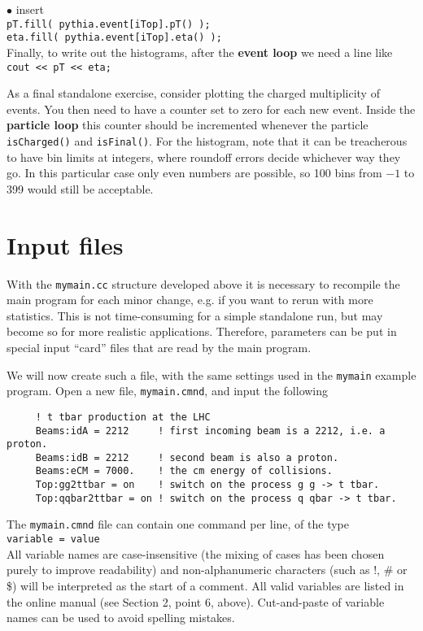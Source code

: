 \documentclass[12pt,a4paper]{article}
\newenvironment{Itemize}{\begin{list}{$\bullet$}%
{\setlength{\topsep}{0.4mm}\setlength{\partopsep}{0.4mm}%
\setlength{\itemsep}{0.4mm}\setlength{\parsep}{0.4mm}}}%
{\end{list}}
\begin{document}
\begin{Itemize}
insert \\
\hspace*{10mm}\texttt{pT.fill( pythia.event[iTop].pT() );}\\
\hspace*{10mm}\texttt{eta.fill( pythia.event[iTop].eta() );}\\
Finally, to write out the histograms, after the \textbf{event loop} we need
a line like
\hspace*{10mm}\texttt{cout << pT << eta;}
\item As a final standalone exercise, consider plotting the charged 
multiplicity of events. You then need to have a counter set to zero
for each new event. Inside the \textbf{particle loop} this counter should
be incremented whenever the particle \texttt{isCharged()} and
\texttt{isFinal()}. For the histogram, note that it can be treacherous to
have bin limits at integers, where roundoff errors decide whichever way
they go. In this particular case only even numbers are possible, so 100
bins from $-1$ to 399 would still be acceptable.
\end{Itemize}

\section{Input files}

With the \texttt{mymain.cc} structure developed above it is necessary to
recompile the main program for each minor change, e.g. if you want to
rerun with more statistics. This is not time-consuming for a simple 
standalone run, but may become so for more realistic applications.
Therefore, parameters can be put in special input ``card'' files
that are read by the main program. 

We will now create such a file, with the same settings used in the
\texttt{mymain} example program. Open a new file, \texttt{mymain.cmnd}, and
input the following
\begin{verbatim}
     ! t tbar production at the LHC
     Beams:idA = 2212     ! first incoming beam is a 2212, i.e. a proton.  
     Beams:idB = 2212     ! second beam is also a proton. 
     Beams:eCM = 7000.    ! the cm energy of collisions. 
     Top:gg2ttbar = on    ! switch on the process g g -> t tbar.  
     Top:qqbar2ttbar = on ! switch on the process q qbar -> t tbar.  
\end{verbatim}

The \texttt{mymain.cmnd} file can contain one command per line,
of the type\\
\hspace*{10mm}\texttt{variable = value}\\
All variable names are case-insensitive (the mixing of cases has been
chosen purely to improve readability) and non-alphanumeric characters
(such as !, \# or \$) will be interpreted as the start of a comment. All
valid variables are listed in the online manual (see Section 2, point 6,
above). Cut-and-paste of variable names can be used to avoid spelling
mistakes.
\end{document}
